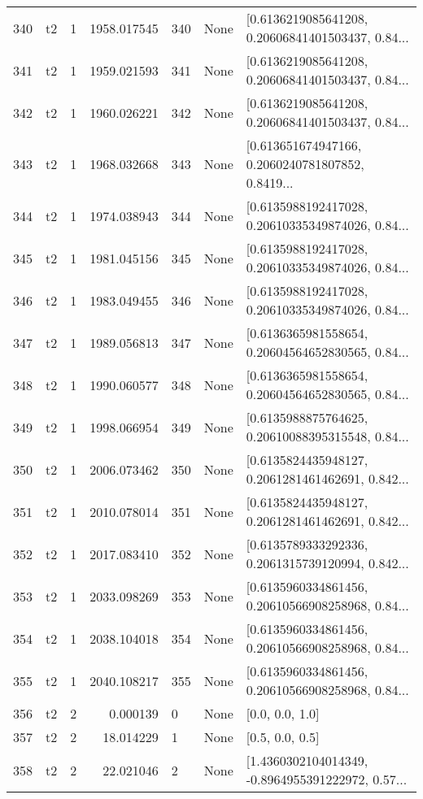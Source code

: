 \begin{tabular}{lllrlll}
340 &  t2 &   1 &  1958.017545 &  340 &  None &  [0.6136219085641208, 0.20606841401503437, 0.84... \\
341 &  t2 &   1 &  1959.021593 &  341 &  None &  [0.6136219085641208, 0.20606841401503437, 0.84... \\
342 &  t2 &   1 &  1960.026221 &  342 &  None &  [0.6136219085641208, 0.20606841401503437, 0.84... \\
343 &  t2 &   1 &  1968.032668 &  343 &  None &  [0.613651674947166, 0.2060240781807852, 0.8419... \\
344 &  t2 &   1 &  1974.038943 &  344 &  None &  [0.6135988192417028, 0.20610335349874026, 0.84... \\
345 &  t2 &   1 &  1981.045156 &  345 &  None &  [0.6135988192417028, 0.20610335349874026, 0.84... \\
346 &  t2 &   1 &  1983.049455 &  346 &  None &  [0.6135988192417028, 0.20610335349874026, 0.84... \\
347 &  t2 &   1 &  1989.056813 &  347 &  None &  [0.6136365981558654, 0.20604564652830565, 0.84... \\
348 &  t2 &   1 &  1990.060577 &  348 &  None &  [0.6136365981558654, 0.20604564652830565, 0.84... \\
349 &  t2 &   1 &  1998.066954 &  349 &  None &  [0.6135988875764625, 0.20610088395315548, 0.84... \\
350 &  t2 &   1 &  2006.073462 &  350 &  None &  [0.6135824435948127, 0.2061281461462691, 0.842... \\
351 &  t2 &   1 &  2010.078014 &  351 &  None &  [0.6135824435948127, 0.2061281461462691, 0.842... \\
352 &  t2 &   1 &  2017.083410 &  352 &  None &  [0.6135789333292336, 0.2061315739120994, 0.842... \\
353 &  t2 &   1 &  2033.098269 &  353 &  None &  [0.6135960334861456, 0.20610566908258968, 0.84... \\
354 &  t2 &   1 &  2038.104018 &  354 &  None &  [0.6135960334861456, 0.20610566908258968, 0.84... \\
355 &  t2 &   1 &  2040.108217 &  355 &  None &  [0.6135960334861456, 0.20610566908258968, 0.84... \\
356 &  t2 &   2 &     0.000139 &    0 &  None &                                    [0.0, 0.0, 1.0] \\
357 &  t2 &   2 &    18.014229 &    1 &  None &                                    [0.5, 0.0, 0.5] \\
358 &  t2 &   2 &    22.021046 &    2 &  None &  [1.4360302104014349, -0.8964955391222972, 0.57... \\

\end{tabular}
